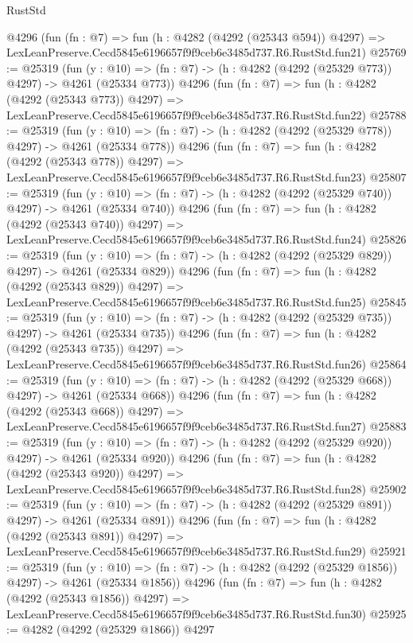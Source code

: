 \begin{lexlean}{RustStd}
\begin{coremodule}
    @4296
    (fun (fn : @7) =>
    fun (h : @4282 (@4292 (@25343 @594)) @4297) =>
    LexLeanPreserve.Cecd5845e6196657f9f9ceb6e3485d737.R6.RustStd.fun21)
@25769 := @25319
    (fun (y : @10) => (fn : @7) -> (h : @4282 (@4292 (@25329 @773)) @4297) -> @4261 (@25334 @773))
    @4296
    (fun (fn : @7) =>
    fun (h : @4282 (@4292 (@25343 @773)) @4297) =>
    LexLeanPreserve.Cecd5845e6196657f9f9ceb6e3485d737.R6.RustStd.fun22)
@25788 := @25319
    (fun (y : @10) => (fn : @7) -> (h : @4282 (@4292 (@25329 @778)) @4297) -> @4261 (@25334 @778))
    @4296
    (fun (fn : @7) =>
    fun (h : @4282 (@4292 (@25343 @778)) @4297) =>
    LexLeanPreserve.Cecd5845e6196657f9f9ceb6e3485d737.R6.RustStd.fun23)
@25807 := @25319
    (fun (y : @10) => (fn : @7) -> (h : @4282 (@4292 (@25329 @740)) @4297) -> @4261 (@25334 @740))
    @4296
    (fun (fn : @7) =>
    fun (h : @4282 (@4292 (@25343 @740)) @4297) =>
    LexLeanPreserve.Cecd5845e6196657f9f9ceb6e3485d737.R6.RustStd.fun24)
@25826 := @25319
    (fun (y : @10) => (fn : @7) -> (h : @4282 (@4292 (@25329 @829)) @4297) -> @4261 (@25334 @829))
    @4296
    (fun (fn : @7) =>
    fun (h : @4282 (@4292 (@25343 @829)) @4297) =>
    LexLeanPreserve.Cecd5845e6196657f9f9ceb6e3485d737.R6.RustStd.fun25)
@25845 := @25319
    (fun (y : @10) => (fn : @7) -> (h : @4282 (@4292 (@25329 @735)) @4297) -> @4261 (@25334 @735))
    @4296
    (fun (fn : @7) =>
    fun (h : @4282 (@4292 (@25343 @735)) @4297) =>
    LexLeanPreserve.Cecd5845e6196657f9f9ceb6e3485d737.R6.RustStd.fun26)
@25864 := @25319
    (fun (y : @10) => (fn : @7) -> (h : @4282 (@4292 (@25329 @668)) @4297) -> @4261 (@25334 @668))
    @4296
    (fun (fn : @7) =>
    fun (h : @4282 (@4292 (@25343 @668)) @4297) =>
    LexLeanPreserve.Cecd5845e6196657f9f9ceb6e3485d737.R6.RustStd.fun27)
@25883 := @25319
    (fun (y : @10) => (fn : @7) -> (h : @4282 (@4292 (@25329 @920)) @4297) -> @4261 (@25334 @920))
    @4296
    (fun (fn : @7) =>
    fun (h : @4282 (@4292 (@25343 @920)) @4297) =>
    LexLeanPreserve.Cecd5845e6196657f9f9ceb6e3485d737.R6.RustStd.fun28)
@25902 := @25319
    (fun (y : @10) => (fn : @7) -> (h : @4282 (@4292 (@25329 @891)) @4297) -> @4261 (@25334 @891))
    @4296
    (fun (fn : @7) =>
    fun (h : @4282 (@4292 (@25343 @891)) @4297) =>
    LexLeanPreserve.Cecd5845e6196657f9f9ceb6e3485d737.R6.RustStd.fun29)
@25921 := @25319
    (fun (y : @10) => (fn : @7) -> (h : @4282 (@4292 (@25329 @1856)) @4297) -> @4261 (@25334 @1856))
    @4296
    (fun (fn : @7) =>
    fun (h : @4282 (@4292 (@25343 @1856)) @4297) =>
    LexLeanPreserve.Cecd5845e6196657f9f9ceb6e3485d737.R6.RustStd.fun30)
@25925 := @4282 (@4292 (@25329 @1866)) @4297

\end{coremodule}
\end{lexlean}
